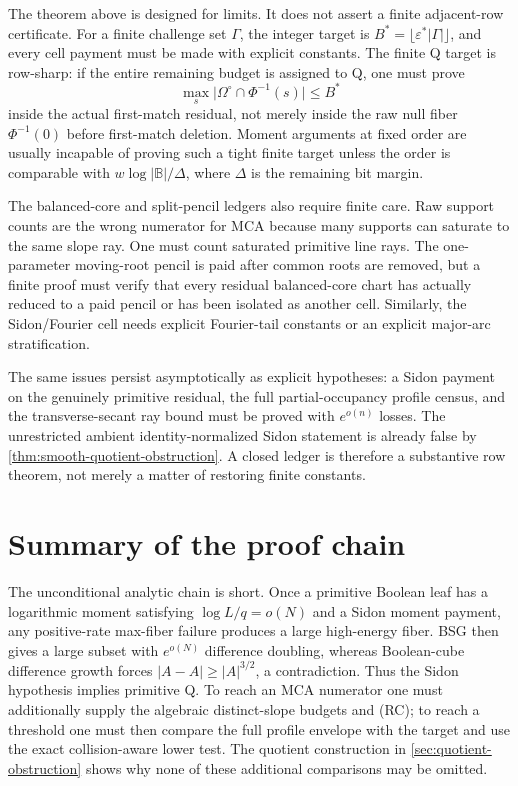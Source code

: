 \documentclass[12pt,a4paper]{amsart}
\numberwithin{equation}{section}
\theoremstyle{remark}
\newcommand{\B}{\mathbb B}
\newcommand{\eps}{\varepsilon}
\newcommand{\Omc}{\Omega^{\circ}}
\newcommand{\abs}[1]{\lvert #1\rvert}
\begin{document}
The theorem above is designed for limits.  It does not assert a finite
adjacent-row certificate.  For a finite challenge set \(\Gamma\), the
integer target is
\(B^{\ast}=\lfloor\eps^{\ast}\abs\Gamma\rfloor\), and every cell payment
must be made with explicit constants.  The finite Q target is row-sharp: if
the entire remaining budget is assigned to Q, one must prove
\[
        \max_s\abs{\Omc\cap\Phi^{-1}(s)}\le B^{\ast}
\]
inside the actual first-match residual, not merely inside the raw null
fiber \(\Phi^{-1}(0)\) before first-match deletion.  Moment arguments at
fixed order are usually incapable of proving such a tight finite target
unless the order is comparable with \(w\log\abs\B/\Delta\), where
\(\Delta\) is the remaining bit margin.

The balanced-core and split-pencil ledgers also require finite care.  Raw support counts are the wrong numerator for MCA because many supports can saturate to the same slope ray.  One must count saturated primitive line rays.  The one-parameter moving-root pencil is paid after common roots are removed, but a finite proof must verify that every residual balanced-core chart has actually reduced to a paid pencil or has been isolated as another cell.  Similarly, the Sidon/Fourier cell needs explicit Fourier-tail constants or an explicit major-arc stratification.

The same issues persist asymptotically as explicit hypotheses: a Sidon
payment on the genuinely primitive residual, the full partial-occupancy
profile census, and the transverse-secant ray bound must be proved with
\(e^{o(n)}\) losses.  The unrestricted ambient identity-normalized Sidon statement
is already false by \cref{thm:smooth-quotient-obstruction}.  A closed ledger
is therefore a substantive row theorem, not merely a matter of restoring
finite constants.

\section{Summary of the proof chain}\label{sec:summary}

The unconditional analytic chain is short.  Once a primitive Boolean leaf
has a logarithmic moment satisfying \(\log L/q=o(N)\) and a Sidon moment
payment, any
positive-rate max-fiber failure produces a large high-energy fiber.  BSG
then gives a large subset with \(e^{o(N)}\) difference doubling, whereas
Boolean-cube difference growth forces \(\abs{A-A}\ge\abs A^{3/2}\), a
contradiction.  Thus the Sidon hypothesis implies primitive Q.  To reach an
MCA numerator one must additionally supply the algebraic distinct-slope
budgets and \textup{(RC)}; to reach a threshold one must then compare the
full profile envelope with the target and use the exact collision-aware
lower test.  The quotient construction in \cref{sec:quotient-obstruction}
shows why none of these additional comparisons may be omitted.
\end{document}
